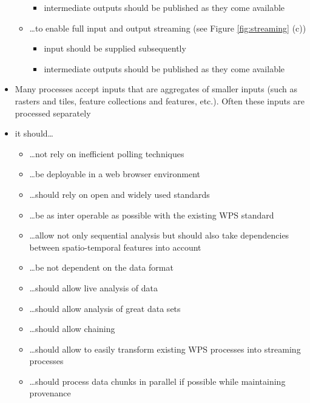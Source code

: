 \begin{itemize}
\begin{itemize}
			\begin{itemize}
				\item intermediate outputs should be published as they come available
			\end{itemize}
			\item \dots to enable full input and output streaming  (see Figure \ref{fig:streaming} (c))
			\begin{itemize}
				\item input should be supplied subsequently
				\item intermediate outputs should be published as they come available
			\end{itemize}
		\end{itemize}
		\item Many processes accept inputs that are aggregates of smaller inputs (such as rasters and tiles, feature collections and features, etc.). Often these inputs are processed separately
		\item it should\dots
		\begin{itemize}
			\item \dots not rely on inefficient polling techniques
			\item \dots be deployable in a web browser environment
			\item \dots should rely on open and widely used standards
			\item \dots be as inter operable as possible with the existing WPS standard
			\item \dots allow not only sequential analysis but should also take dependencies between spatio-temporal features into account
			\item \dots be not dependent on the data format
			\item \dots should allow live analysis of data
			\item \dots should allow analysis of great data sets
			\item \dots should allow chaining
			\item \dots should allow to easily transform existing WPS processes into streaming processes
			\item \dots should process data chunks in parallel if possible while maintaining provenance
		\end{itemize}


\end{itemize}
